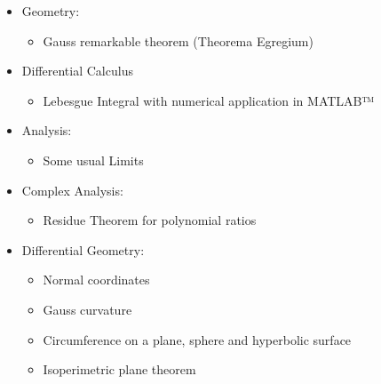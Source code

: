 \begin{itemize}
\begin{itemize}
				\item Survey Theory
				\item Canonical Analysis
				\item Tucker's Inter-battery factor analysis
				\item PLS regression (partial least squares)
				\item Two-Stage Least Squares (2SLS) regression
				\item Logic regression
				\item Adjusted Chi-squared
				\item Schoenfeld residuals 
				\item Jarque-Bera test
				\item Dixon, Grubbs, Chi-square outliers tests
				\item Somers'd rank coefficient
				\item Kaplan-Meier sample size\footnote{Sample size calculation: Survival analysis (logrank test)}
				\item Weighted PCA
			\end{itemize}
		\item Geometry:
			\begin{itemize}
				\item Gauss remarkable theorem (Theorema Egregium)
			\end{itemize}
		\item Differential Calculus
			\begin{itemize}
				\item Lebesgue Integral with numerical application in MATLAB™
			\end{itemize}
		\item Analysis: 
			\begin{itemize}
				\item Some usual Limits
			\end{itemize}
		\item Complex Analysis: 
			\begin{itemize}
				\item Residue Theorem for polynomial ratios
			\end{itemize}			
		\item Differential Geometry: 
			\begin{itemize}
				\item Normal coordinates
				\item Gauss curvature
				\item Circumference on a plane, sphere and hyperbolic surface
				\item Isoperimetric plane theorem

\end{itemize}
\end{itemize}
